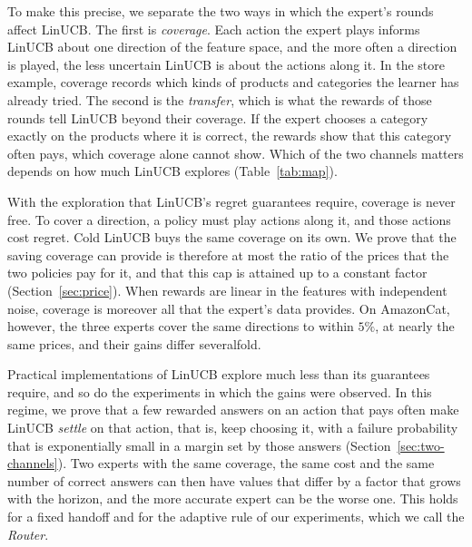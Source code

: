 \documentclass[anon]{alt2027} %
\newif\ifrevmarks\revmarkstrue
\newenvironment{revised}{\ifrevmarks\color{revcolor}\fi}{}
\begin{document}
\begin{revised}
To make this precise, we separate the two ways in which the expert's rounds
affect LinUCB. The first is \emph{coverage}. Each action the expert plays
informs LinUCB about one direction of the feature space, and the more often
a direction is played, the less uncertain LinUCB is about the actions along
it. In the store example, coverage records which kinds of products and
categories the learner has already tried. The second is the
\emph{transfer}, which is what the rewards of those rounds tell LinUCB
beyond their coverage. If the expert chooses a category exactly on the
products where it is correct, the rewards show that this category often
pays, which coverage alone cannot show. Which of the two channels matters
depends on how much LinUCB explores (Table~\ref{tab:map}).
\end{revised}

\begin{revised}
With the exploration that LinUCB's regret guarantees require, coverage is
never free. To cover a direction, a policy must play actions along it, and
those actions cost regret. Cold LinUCB buys the same coverage on its own. We
prove that the saving coverage can provide is therefore at most the ratio of
the prices that the two policies pay for it, and that this cap is attained
up to a constant factor (Section~\ref{sec:price}). When rewards are linear
in the features with independent noise, coverage is moreover all that the
expert's data provides. On AmazonCat, however, the three experts cover the
same directions to within $5\%$, at nearly the same prices, and their gains
differ severalfold.
\end{revised}

\begin{revised}
Practical implementations of LinUCB explore much less than its guarantees
require, and so do the experiments in which the gains were observed. In
this regime, we prove that a few rewarded answers on an action that pays
often make LinUCB \emph{settle} on that action, that is, keep choosing it,
with a failure probability that is exponentially small in a margin set by
those answers (Section~\ref{sec:two-channels}). Two experts with the same
coverage, the same cost and the same number of correct answers can then
have values that differ by a factor that grows with the horizon, and the
more accurate expert can be the worse one. This holds for a fixed handoff
and for the adaptive rule of our experiments, which we call the
\emph{Router}.
\end{revised}
\end{document}
